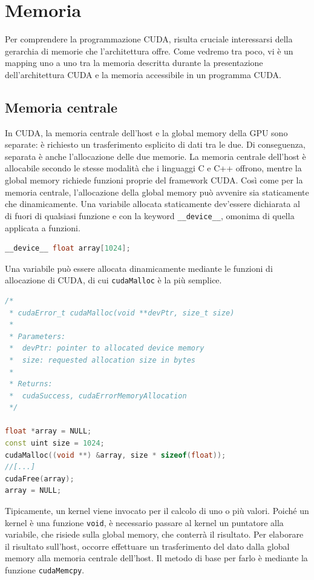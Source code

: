 \section{Memoria}
Per comprendere la programmazione CUDA, risulta cruciale interessarsi della gerarchia di memorie che l'architettura offre. 
Come vedremo tra poco, vi è un mapping uno a uno tra la memoria descritta durante la presentazione dell'architettura CUDA e la memoria accessibile in un programma CUDA.

\subsection{Memoria centrale}
In CUDA, la memoria centrale dell'host e la global memory della GPU sono separate: è richiesto un trasferimento esplicito di dati tra le due.
Di conseguenza, separata è anche l'allocazione delle due memorie.
La memoria centrale dell'host è allocabile secondo le stesse modalità che i linguaggi C e C++ offrono, mentre la global memory richiede funzioni proprie del framework CUDA.
Così come per la memoria centrale, l'allocazione della global memory può avvenire sia staticamente che dinamicamente.
Una variabile allocata staticamente dev'essere dichiarata al di fuori di qualsiasi funzione e con la keyword \texttt{\_\_device\_\_}, omonima di quella applicata a funzioni.

\begin{lstlisting}[language=C++, numbers=none]
__device__ float array[1024];
\end{lstlisting}

Una variabile può essere allocata dinamicamente mediante le funzioni di allocazione di CUDA, di cui \texttt{cudaMalloc} è la più semplice.

\begin{lstlisting}[language=C++, numbers=none]
/*
 * cudaError_t cudaMalloc(void **devPtr, size_t size)	
 * 
 * Parameters:
 *  devPtr: pointer to allocated device memory
 *  size: requested allocation size in bytes
 *
 * Returns:
 *  cudaSuccess, cudaErrorMemoryAllocation
 */

float *array = NULL; 
const uint size = 1024;
cudaMalloc((void **) &array, size * sizeof(float));
//[...]
cudaFree(array);
array = NULL;
\end{lstlisting}

Tipicamente, un kernel viene invocato per il calcolo di uno o più valori.
Poiché un kernel è una funzione \texttt{void}, è necessario passare al kernel un puntatore alla variabile, che risiede sulla global memory, che conterrà il risultato.
Per elaborare il risultato sull'host, occorre effettuare un trasferimento del dato dalla global memory alla memoria centrale dell'host.
Il metodo di base per farlo è mediante la funzione \texttt{cudaMemcpy}.

